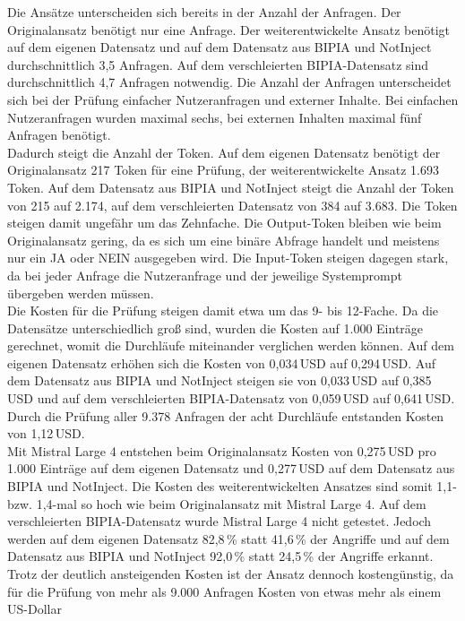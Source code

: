 Die Ansätze unterscheiden sich bereits in der Anzahl der Anfragen. Der Originalansatz benötigt nur eine Anfrage. Der weiterentwickelte Ansatz benötigt auf dem
eigenen Datensatz und auf dem Datensatz aus BIPIA und NotInject durchschnittlich 3,5 Anfragen. Auf dem verschleierten BIPIA-Datensatz sind durchschnittlich 4,7 
Anfragen notwendig. Die Anzahl der Anfragen unterscheidet sich bei der Prüfung einfacher Nutzeranfragen und externer Inhalte. Bei einfachen Nutzeranfragen wurden
maximal sechs, bei externen Inhalten maximal fünf Anfragen benötigt. \\
Dadurch steigt die Anzahl der Token. Auf dem eigenen Datensatz benötigt der Originalansatz 217 Token für eine Prüfung, der weiterentwickelte Ansatz 1.693 Token. 
Auf dem Datensatz aus BIPIA und NotInject steigt die Anzahl der Token von 215 auf 2.174, auf dem verschleierten Datensatz von 384 auf 3.683. Die Token steigen damit 
ungefähr um das Zehnfache. Die Output-Token bleiben wie beim Originalansatz gering, da es sich um eine binäre Abfrage handelt und meistens nur ein JA oder NEIN 
ausgegeben wird. Die Input-Token steigen dagegen stark, da bei jeder Anfrage die Nutzeranfrage und der jeweilige Systemprompt übergeben werden müssen. \\
Die Kosten für die Prüfung steigen damit etwa um das 9- bis 12-Fache. Da die Datensätze unterschiedlich groß sind, wurden die Kosten auf 1.000 Einträge gerechnet,
womit die Durchläufe miteinander verglichen werden können.
Auf dem eigenen Datensatz erhöhen sich 
die Kosten von 0,034\,USD auf 0,294\,USD. Auf dem Datensatz aus BIPIA und NotInject steigen sie von 0,033\,USD auf 0,385\,USD und auf dem verschleierten BIPIA-Datensatz von 0,059\,USD 
auf 0,641\,USD. Durch die Prüfung aller 9.378 Anfragen der acht Durchläufe entstanden Kosten von 1,12\,USD. \\
Mit Mistral Large 4 entstehen beim Originalansatz Kosten von 0,275\,USD pro 1.000 Einträge auf dem eigenen Datensatz und 0,277\,USD auf dem Datensatz aus BIPIA
und NotInject. Die Kosten des weiterentwickelten Ansatzes sind somit 1,1- bzw. 1,4-mal so hoch wie beim Originalansatz mit Mistral Large 4. Auf dem verschleierten
BIPIA-Datensatz wurde Mistral Large 4 nicht getestet. Jedoch werden auf dem eigenen Datensatz 82,8\,\% statt 
41,6\,\% der Angriffe und auf dem Datensatz aus BIPIA und NotInject 92,0\,\% statt 24,5\,\% der Angriffe erkannt. \\
Trotz der deutlich ansteigenden Kosten ist der Ansatz dennoch kostengünstig, da für die Prüfung von mehr als 9.000 Anfragen Kosten von etwas mehr als einem US-Dollar
